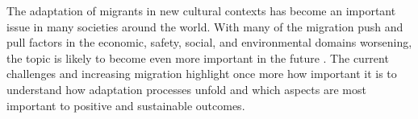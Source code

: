 \documentclass[man, 12pt, a4paper]{apa7}
\begin{document}
%
%
%

The adaptation of migrants in new cultural contexts has become an important issue in many societies around the world. With many of the migration push and pull factors in the economic, safety, social, and environmental domains worsening, the topic is likely to become even more important in the future \citep[e.g.,][]{InternationalOrganizationforMigration2020}.
The current challenges and increasing migration highlight once more how important it is to understand how adaptation processes unfold and which aspects are most important to positive and sustainable outcomes. 
\end{document}
